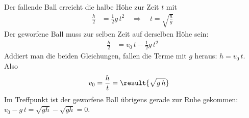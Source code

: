 \begin{center}
\end{center}

Der fallende Ball erreicht die halbe Höhe zur Zeit $t$ mit
\begin{align}
 \frac{h}{2} &= \frac{1}{2}g\,t^2 \quad\Rightarrow\quad t = \sqrt{\frac{h}{g}}
\end{align}
Der geworfene Ball muss zur selben Zeit auf derselben Höhe sein:
\begin{align}
 \frac{h}{2} &= v_0\,t - \frac{1}{2}g\,t^2
\end{align}
Addiert man die beiden Gleichungen, fallen die Terme mit $g$ heraus: $h = v_0\,t$. Also
\begin{align}
 v_0 &= \frac{h}{t} = \result{\sqrt{g\,h}}
\end{align}
Im Treffpunkt ist der geworfene Ball übrigens gerade zur Ruhe gekommen: $v_0 - g\,t = \sqrt{gh}-\sqrt{gh} = 0$.
